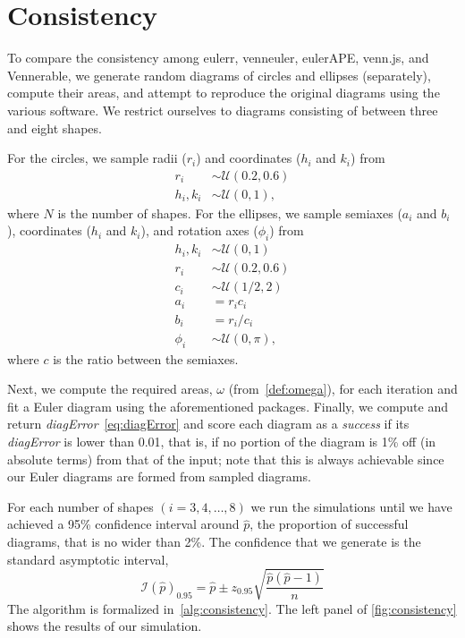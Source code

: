 \documentclass[
  oneside,
  openany,
  numbers=noendperiod,
  parskip=half,
  bibliography=totoc
]{scrbook}\usepackage[]{graphicx}\usepackage{xcolor}
\newcommand{\pkg}[1]{{\fontseries{b}\selectfont #1}}
\begin{document}
\section{Consistency}
\label{sec:consistency}

To compare the consistency among \pkg{eulerr}, \pkg{venneuler}, \pkg{eulerAPE},
\pkg{venn.js}, and \pkg{Vennerable}, we generate random diagrams of circles and
ellipses (separately), compute their areas, and attempt to reproduce the original diagrams
using the various software. We restrict ourselves to
diagrams consisting of between three and eight shapes.

For the circles, we sample radii ($r_i$) and coordinates ($h_i$ and $k_i$) from
%
\begin{equation}
\begin{aligned}
r_i     & \sim \mathcal{U}(0.2, 0.6)\\
h_i,k_i & \sim \mathcal{U}(0, 1),
\end{aligned}
\label{eq:consistencyCircles}
\end{equation}
where $N$ is the number of shapes.
For the ellipses, we sample semiaxes ($a_i$ and $b_i$), coordinates
($h_i$ and $k_i$), and rotation axes ($\phi_i$) from
%
\begin{equation}
\begin{aligned}
h_i,k_i & \sim \mathcal{U}(0, 1)\\
r_i     & \sim \mathcal{U}(0.2, 0.6)\\
c_i     & \sim \mathcal{U}(1/2, 2)\\
a_i     & = r_ic_i\\
b_i     & = r_i/c_i\\
\phi_i  & \sim \mathcal{U}(0, \pi),
\end{aligned}
\label{eq:consistencyEllipses}
\end{equation}
where $c$ is the ratio between the semiaxes.

Next, we compute the required areas, $\omega$ (from~\cref{def:omega}), for each
iteration and fit a Euler diagram using the aforementioned packages. Finally,
we compute and return \emph{diagError}~\eqref{eq:diagError} and score each
diagram as a \emph{success} if its \emph{diagError} is lower than 0.01, that is,
if no portion of the diagram is 1\% off (in absolute terms) from that of the
input; note that this is always achievable since our Euler diagrams are formed
from sampled diagrams.

For each number of shapes $(i=3,4,\dots,8)$ we run the simulations until we have
achieved a 95\% confidence interval around $\hat{p}$, the proportion of
successful diagrams, that is no wider than 2\%. The confidence that we generate
is the standard asymptotic interval,
\begin{equation*}
\mathcal{I}(\hat{p})_{0.95} = \hat{p} \pm z_{0.95}\sqrt{\frac{\hat{p}(\hat{p}-1)}{n}}
\end{equation*}
The algorithm is formalized in~\autoref{alg:consistency}. The left panel of
\cref{fig:consistency} shows the results of our simulation.
\end{document}
